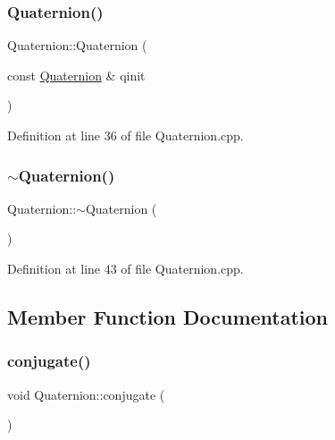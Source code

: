 \mbox{\label{class_quaternion_ad4662fcc6d9f27298e6020f7fbf715b5}} 
\subsubsection{\texorpdfstring{Quaternion()}{Quaternion()}\hspace{0.1cm}{\footnotesize\ttfamily [3/3]}}
{\footnotesize\ttfamily Quaternion\+::\+Quaternion (\begin{DoxyParamCaption}\item[{const \mbox{\hyperlink{class_quaternion}{Quaternion}} \&}]{qinit }\end{DoxyParamCaption})}



Definition at line 36 of file Quaternion.\+cpp.

\mbox{\label{class_quaternion_a5f834c2ca469cd71edc8a23fdc3f56e8}} 
\subsubsection{\texorpdfstring{$\sim$\+Quaternion()}{~Quaternion()}}
{\footnotesize\ttfamily Quaternion\+::$\sim$\+Quaternion (\begin{DoxyParamCaption}{ }\end{DoxyParamCaption})}



Definition at line 43 of file Quaternion.\+cpp.



\subsection{Member Function Documentation}
\mbox{\label{class_quaternion_ae387bec8f394bdc58a5ac1480f11140f}} 
\subsubsection{\texorpdfstring{conjugate()}{conjugate()}}
{\footnotesize\ttfamily void Quaternion\+::conjugate (\begin{DoxyParamCaption}{ }\end{DoxyParamCaption})}



